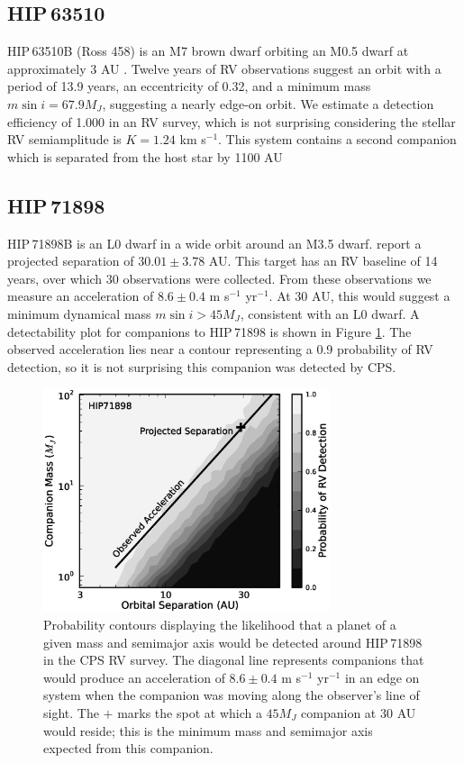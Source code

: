 \subsection{HIP\,63510}
HIP\,63510B (Ross 458) is an M7 brown dwarf orbiting an M0.5 dwarf at approximately 3 AU \citep{Beuzit04}. Twelve years of RV observations suggest an orbit with a period of 13.9 years, an eccentricity of 0.32, and a minimum mass $m\sin i = 67.9 M_J$, suggesting a nearly edge-on orbit. We estimate a detection efficiency of 1.000 in an RV survey, which is not surprising considering the stellar RV semiamplitude is $K = 1.24$ km s$^{-1}$. This system contains a second companion which is separated from the host star by 1100 AU \citep{Goldman10, Scholz10}

\subsection{HIP\,71898}
HIP\,71898B is an L0 dwarf in a wide orbit around an M3.5 dwarf. \citet{Golimowski04} report a projected separation of $30.01 \pm 3.78$ AU. This target has an RV baseline of 14 years, over which 30 observations were collected. From these observations we measure an acceleration of $8.6 \pm 0.4$ m s$^{-1}$ yr$^{-1}$. At 30 AU, this would suggest a minimum dynamical mass $m \sin i > 45 M_J$, consistent with an L0 dwarf. A detectability plot for companions to HIP\,71898 is shown in Figure \ref{71898}. The observed acceleration lies near a contour representing a 0.9 probability of RV detection, so it is not surprising this companion was detected by CPS. 

\begin{figure}[htbp]
\centerline{\includegraphics[width=0.75\textwidth]{chapter3/f18.eps}}
\caption[Probability contours displaying the likelihood that a planet of a given mass and semimajor axis would be detected around HIP\,71898 in the CPS RV survey]{ Probability contours displaying the likelihood that a planet of a given mass and semimajor axis would be detected around HIP\,71898 in the CPS RV survey. The diagonal line represents companions that would produce an acceleration of $8.6 \pm 0.4$ m s$^{-1}$ yr$^{-1}$ in an edge on system when the companion was moving along the observer's line of sight. The $+$ marks the spot at which a $45 M_J$ companion at 30 AU would reside; this is the minimum mass and semimajor axis expected from this companion. 
  }
\label{71898}
\end{figure}

